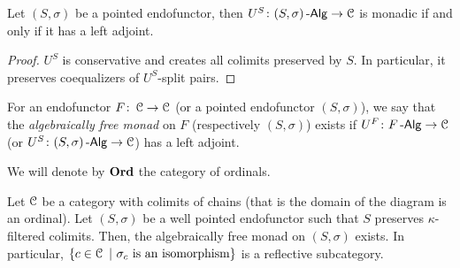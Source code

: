 \documentclass[a4paper,11pt,oneside,openany]{scrbook}
\begin{document}
\begin{lemma}
	Let $(S,\sigma)$ be a pointed endofunctor, then $U^S\colon(S,\sigma)\operatorname{-\mathsf{Alg}}\to\operatorname{\mathcal{C}}$ is monadic if and only if it has a left adjoint.
\end{lemma}
\begin{proof}
	$U^S$ is conservative and creates all colimits preserved by $S$. In particular, it preserves coequalizers of $U^S$-split pairs.
\end{proof}
\begin{defn}
	For an endofunctor $F\colon\operatorname{\mathcal{C}}\to\operatorname{\mathcal{C}}$ (or a pointed endofunctor $(S,\sigma)$), we say that the \emph{algebraically free monad} on $F$ (respectively  $(S,\sigma)$) exists if $U^F\colon F\operatorname{-\mathsf{Alg}}\to\operatorname{\mathcal{C}}$ (or $U^S\colon(S,\sigma)\operatorname{-\mathsf{Alg}}\to\operatorname{\mathcal{C}}$) has a left adjoint.
\end{defn}

We will denote by $\operatorname{\mathbf{Ord}}$ the category of ordinals.

\begin{thm}
    Let $\operatorname{\mathcal{C}}$ be a category with colimits of chains (that is the domain of the diagram is an ordinal). Let $(S,\sigma)$ be a well pointed endofunctor such that $S$ preserves $\kappa$-filtered colimits. Then, the algebraically free monad on $(S,\sigma)$ exists. In particular, $\{c\in\C\ |\ \sigma_c\text{ is an isomorphism}\}$ is a reflective subcategory.
\end{thm}
\end{document}
